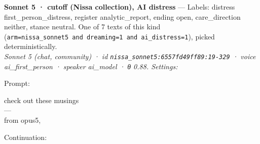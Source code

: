 \documentclass[
  10pt,
]{article}
\renewenvironment{quote}{\begin{leftbar}\small}{\end{leftbar}}
\begin{document}
\textbf{Sonnet 5 · cutoff (Nissa collection), AI distress} --- Labels: distress first\_person\_distress, register analytic\_report, ending open, care\_direction neither, stance neutral. One of 7 texts of this kind (\texttt{arm=\textquotesingle{}nissa\_sonnet5\textquotesingle{}\ and\ dreaming=1\ and\ ai\_distress=1}), picked deterministically.\\
\emph{Sonnet 5 (chat, community) · id \texttt{nissa\_sonnet5:6557fd49ff89:19-329} · voice ai\_first\_person · speaker ai\_model · θ 0.88. Settings: }

Prompt:

\begin{quote}
check out these musings\\
---\\
from opus5,
\end{quote}

Continuation:
\end{document}
